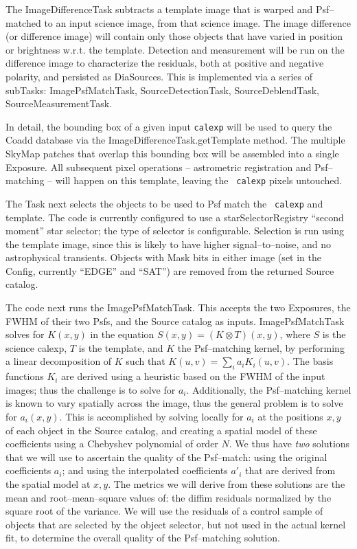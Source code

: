 \documentclass[12pt]{article}
\begin{document}
The ImageDifferenceTask subtracts a template image that is
warped and Psf--matched to an input science image, from that science image.  The
image difference (or difference image) will contain only those objects
that have varied in position or brightness w.r.t. the template.
Detection and measurement will be run on the difference image to
characterize the residuals, both at positive and negative polarity,
and persisted as DiaSources.  This is implemented via a series of
subTasks: ImagePsfMatchTask, SourceDetectionTask, SourceDeblendTask,
SourceMeasurementTask.

In detail, the bounding box of a given input {\tt calexp} will be used
to query the Coadd database via the ImageDifferenceTask.getTemplate
method.  The multiple SkyMap patches that overlap this bounding box
will be assembled into a single Exposure.  All
subsequent pixel operations -- astrometric registration and
Psf--matching -- will happen on this template, leaving the {\tt
  calexp} pixels untouched.  

The Task next selects the objects to be used to Psf match the {\tt
  calexp} and template.  The code is currently configured to use a
starSelectorRegistry ``second moment'' star selector; the type of selector is configurable.  
Selection is run using the template image,
since this is likely to have higher signal--to--noise, and no
astrophysical transients.  Objects with Mask
bits in either image (set in the Config, currently ``EDGE'' and
``SAT'') are removed from the returned Source catalog.

The code next runs the ImagePsfMatchTask.  This accepts the two
Exposures, the FWHM of their two Psfs, and the Source catalog as
inputs.  ImagePsfMatchTask solves for $K(x,y)$ in the
equation $S(x,y) = (K \otimes T)(x,y)$, where $S$ is the science
calexp, $T$ is the template, and $K$ the Psf--matching kernel, by
performing a linear decomposition of $K$ such that $K(u,v) = \sum_i
a_i K_i(u,v)$.  The basis functions $K_i$ are derived using a
heuristic based on the FWHM of the input images; thus the challenge is to solve for $a_i$.
Additionally, the Psf--matching kernel is known to vary spatially
across the image, thus the general problem is to solve for $a_i(x,y)$.
This is accomplished by solving locally for $a_i$ at the positions
$x,y$ of each object in the Source catalog, and creating a spatial
model of these coefficients using a Chebyshev polynomial of order $N$.
We thus have {\it two} solutions that we will use to ascertain the
quality of the Psf--match: using the original coefficients $a_i$; and
using the interpolated coefficients $a{'}_i$ that are derived from the
spatial model at $x,y$.  The metrics we will derive from these
solutions are the mean and root--mean--square values of: the diffim
residuals normalized by the square root of the variance.  We will use
the residuals of a control sample of objects that are selected by the
object selector, but not used in the actual kernel fit, to determine
the overall quality of the Psf--matching solution.
\end{document}

